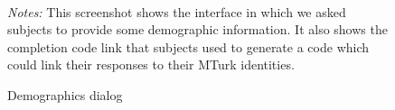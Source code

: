 \documentclass[11pt]{article}
\begin{document}
\begin{figure}
  \caption{Demographics dialog \label{fig:demographics}}
\centering
\begin{minipage}{0.85\linewidth}
\\
\footnotesize \emph{Notes:} This screenshot shows the interface in
which we asked subjects to provide some demographic information. It
also shows the completion code link that subjects used to generate
a code which could link their responses to their MTurk identities. 
\end{minipage}
\end{figure}
\end{document}
